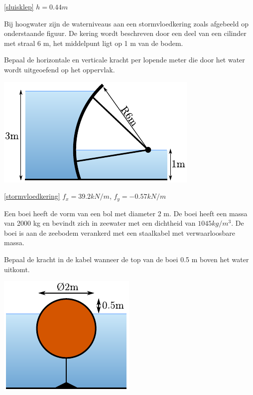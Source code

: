\begin{antwoord}{\ref{sluisklep}}
	$h = 0.44 \unit{m}$
\end{antwoord}
\begin{toepassing}[*]
	\label{stormvloedkering}
Bij hoogwater zijn de waterniveaus aan een stormvloedkering zoals afgebeeld op onderstaande figuur. De kering wordt beschreven door een deel van een cilinder met straal 6 m, het middelpunt ligt op 1 m van de bodem.
		
Bepaal de horizontale en verticale kracht per lopende meter die door het water wordt uitgeoefend op het oppervlak.

	\centering
	\includegraphics{fig/hydrostatica/stormvloedkering}
\end{toepassing}
\begin{antwoord}{\ref{stormvloedkering}}
	$f_x = 39.2 \unit{kN/m}$, $f_y = -0.57 \unit{kN/m}$
\end{antwoord}
\begin{toepassing}
	\label{boei}
Een boei heeft de vorm van een bol met diameter 2 m. De boei heeft een massa van 2000 kg en bevindt zich in zeewater met een dichtheid van $1045 \unit{kg/m^3}$. De boei is aan de zeebodem verankerd met een staalkabel met verwaarloosbare massa.
		
Bepaal de kracht in de kabel wanneer de top van de boei 0.5 m boven het water uitkomt.

	\centering
	\includegraphics{fig/hydrostatica/boei}
\end{toepassing}
